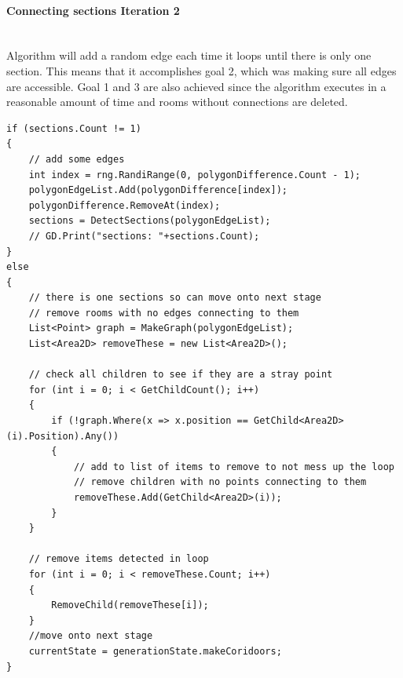 \documentclass{article}
\newcommand{\myparagraph}[1]{\paragraph{#1}\mbox{}\\} %
\begin{document}
\myparagraph{Connecting sections Iteration 2}
Algorithm will add a random edge each time it loops until there is only one section. This means that it accomplishes goal 2, which was making sure all edges are accessible. Goal 1 and 3 are also achieved since the algorithm executes in a reasonable amount of time and rooms without connections are deleted.
\begin{lstlisting}
if (sections.Count != 1)
{
    // add some edges
    int index = rng.RandiRange(0, polygonDifference.Count - 1);
    polygonEdgeList.Add(polygonDifference[index]);
    polygonDifference.RemoveAt(index);
    sections = DetectSections(polygonEdgeList);
    // GD.Print("sections: "+sections.Count);
}
else
{
	// there is one sections so can move onto next stage
    // remove rooms with no edges connecting to them
    List<Point> graph = MakeGraph(polygonEdgeList);
    List<Area2D> removeThese = new List<Area2D>();

    // check all children to see if they are a stray point
    for (int i = 0; i < GetChildCount(); i++)
    {
        if (!graph.Where(x => x.position == GetChild<Area2D>(i).Position).Any())
        {
            // add to list of items to remove to not mess up the loop
            // remove children with no points connecting to them
            removeThese.Add(GetChild<Area2D>(i));
        }
    }

    // remove items detected in loop
    for (int i = 0; i < removeThese.Count; i++)
    {
        RemoveChild(removeThese[i]);
    }
	//move onto next stage
    currentState = generationState.makeCoridoors;
}
\end{lstlisting}
\end{document}

